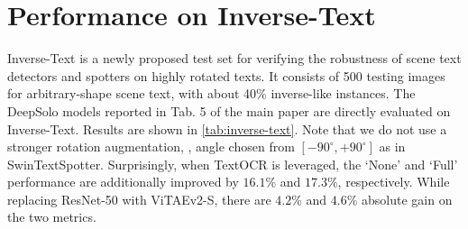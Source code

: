 \documentclass[10pt,twocolumn,letterpaper]{article}
\begin{document}
\section{Performance on Inverse-Text}
Inverse-Text \cite{ye2022dptext} is a newly proposed test set for verifying the robustness of scene text detectors and spotters on highly rotated texts. It consists of 500 testing images for arbitrary-shape scene text, with about 40$\%$ inverse-like instances. The DeepSolo models reported in Tab. 5 of the main paper are directly evaluated on Inverse-Text. Results are shown in \cref{tab:inverse-text}. Note that we do not use a stronger rotation augmentation, \eg, angle chosen from $[-90^{\circ}, +90^{\circ}]$ as in SwinTextSpotter. Surprisingly, when TextOCR is leveraged, the ‘None' and ‘Full' performance are additionally improved by $16.1\%$ and $17.3\%$, respectively. While replacing ResNet-50 with ViTAEv2-S, there are $4.2\%$ and $4.6\%$ absolute gain on the two metrics.
\end{document}
